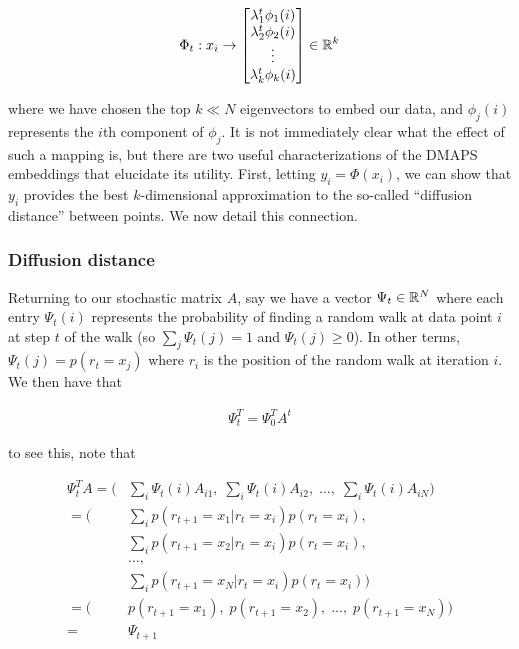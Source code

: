 \begin{align}
  \Phi_t: x_i \rightarrow \begin{bmatrix} \lambda_1^t \phi_1(i) \\ \lambda_2^t
    \phi_2(i) \\ \vdots \\ \lambda_k^t \phi_k(i) \end{bmatrix} \in \mathbb{R}^k
\end{align}

where we have chosen the top $k \ll N$ eigenvectors to embed our data,
and $\phi_j(i)$ represents the $i$th component of $\phi_j$. It is not
immediately clear what the effect of such a mapping is, but there are
two useful characterizations of the DMAPS embeddings that elucidate
its utility. First, letting $y_i = \Phi(x_i)$, we can show that $y_i$
provides the best $k$-dimensional approximation to the so-called
``diffusion distance'' between points. We now detail this connection.

\subsubsection{Diffusion distance}

Returning to our stochastic matrix $A$, say we have a vector
$\Psi_t \in \mathbb{R}^N$ where each entry $\Psi_t(i)$ represents the
probability of finding a random walk at data point $i$ at step $t$ of
the walk (so $\sum_j \Psi_t(j) = 1$ and $\Psi_t(j) \ge 0$). In other
terms, $\Psi_t(j) = p(r_t = x_j)$ where $r_i$ is the position of the
random walk at iteration $i$. We then have that

\begin{align}
  \Psi_t^T = \Psi_0^T A^t
\end{align}

to see this, note that

\begin{align*}
  \Psi_t^T A = \big( &\sum_i \Psi_t(i) A_{i1},\; \sum_i
                         \Psi_t(i) A_{i2},\; \dots,\; \sum_i \Psi_t(i) A_{iN} \big) \\
             = \bigg( &\sum_i p(r_{t+1} = x_1 | r_t = x_i)p(r_t = x_i) , \\
             & \sum_i p(r_{t+1} = x_2 | r_t = x_i)p(r_t = x_i), \\
             & \dots, \\
                     & \sum_i p(r_{t+1} = x_N | r_t = x_i)p(r_t = x_i)
                       \bigg) \\
  = \bigg( & p(r_{t+1} = x_1), \;p(r_{t+1} = x_2), \; \dots, \;
             p(r_{t+1} = x_N) \bigg) \\
  = & \Psi_{t+1}
\end{align*}

